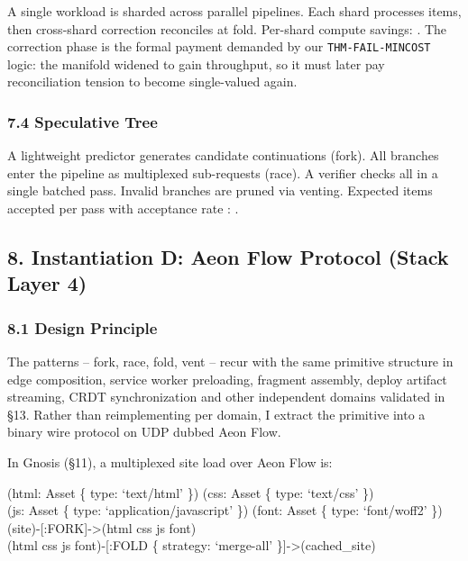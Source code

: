 \documentclass[
]{article}
\begin{document}
A single workload is sharded across parallel pipelines. Each shard
processes items, then cross-shard correction reconciles at fold.
Per-shard compute savings: . The correction phase is the formal payment
demanded by our \texttt{THM-FAIL-MINCOST} logic: the manifold widened to
gain throughput, so it must later pay reconciliation tension to become
single-valued again.

\subsubsection{\texorpdfstring{\textbf{7.4 Speculative
Tree}}{7.4 Speculative Tree}}\label{speculative-tree}

A lightweight predictor generates candidate continuations (fork). All
branches enter the pipeline as multiplexed sub-requests (race). A
verifier checks all in a single batched pass. Invalid branches are
pruned via venting. Expected items accepted per pass with acceptance
rate : .

\subsection{\texorpdfstring{\textbf{8. Instantiation D: Aeon Flow
Protocol (Stack Layer
4)}}{8. Instantiation D: Aeon Flow Protocol (Stack Layer 4)}}\label{instantiation-d-aeon-flow-protocol-stack-layer-4}

\subsubsection{\texorpdfstring{\textbf{8.1 Design
Principle}}{8.1 Design Principle}}\label{design-principle}

The patterns -- fork, race, fold, vent -- recur with the same primitive
structure in edge composition, service worker preloading, fragment
assembly, deploy artifact streaming, CRDT synchronization and other
independent domains validated in §13. Rather than reimplementing per
domain, I extract the primitive into a binary wire protocol on UDP
dubbed Aeon Flow.

In Gnosis (§11), a multiplexed site load over Aeon Flow is:

(html: Asset \{ type: `text/html' \}) (css: Asset \{ type: `text/css'
\})\\
(js: Asset \{ type: `application/javascript' \}) (font: Asset \{ type:
`font/woff2' \})\\
(site)-{[}:FORK{]}-\textgreater(html \textbar{} css \textbar{} js
\textbar{} font)\\
(html \textbar{} css \textbar{} js \textbar{} font)-{[}:FOLD \{
strategy: `merge-all' \}{]}-\textgreater(cached\_site)
\end{document}
